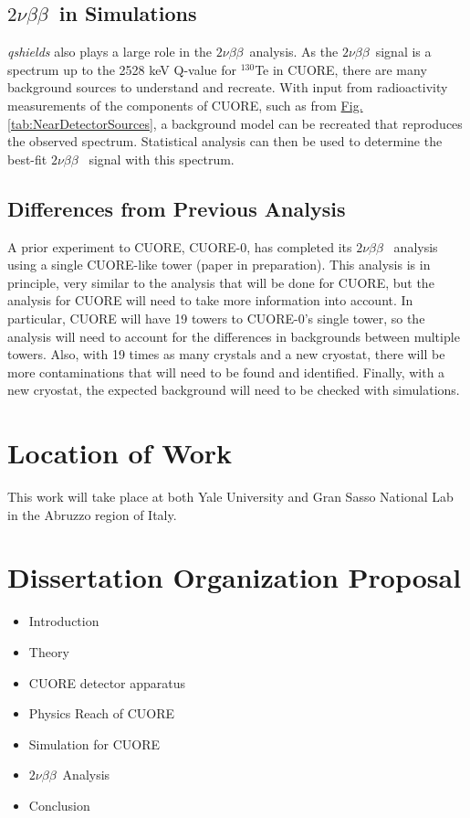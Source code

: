 \documentclass[12pt,a4paper]{article}
\newcommand{\twonubb}{$2\nu \beta \beta$}
\begin{document}
\subsection{\twonubb~in Simulations}
\textit{qshields} also plays a large role in the \twonubb~analysis. As the \twonubb~signal is a spectrum up to the 2528 keV Q-value for $^{130}$Te in CUORE, there are many background sources to understand and recreate. With input from radioactivity measurements of the components of CUORE, such as from \hyperref[tab:NearDetectorSources]{Fig. \ref*{tab:NearDetectorSources}}, a background model can be recreated that reproduces the observed spectrum. Statistical analysis can then be used to determine the best-fit \twonubb~ signal with this spectrum.

\subsection{Differences from Previous Analysis}
A prior experiment to CUORE, CUORE-0, has completed its \twonubb~ analysis using a single CUORE-like tower (paper in preparation). This analysis is in principle, very similar to the analysis that will be done for CUORE, but the analysis for CUORE will need to take more information into account. In particular, CUORE will have 19 towers to CUORE-0's single tower, so the analysis will need to account for the differences in backgrounds between multiple towers. Also, with 19 times as many crystals and a new cryostat, there will be more contaminations that will need to be found and identified. Finally, with a new cryostat, the expected background will need to be checked with simulations.
\section{Location of Work}

This work will take place at both Yale University and Gran Sasso National Lab in the Abruzzo region of Italy. 


\section{Dissertation Organization Proposal}

\begin{itemize}
\item Introduction
\item Theory
\item CUORE detector apparatus
\item Physics Reach of CUORE
\item Simulation for CUORE
\item \twonubb~Analysis
\item Conclusion
\end{itemize}
\end{document}
